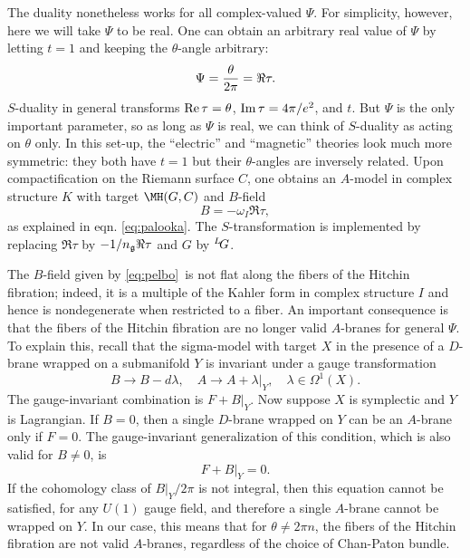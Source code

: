 The duality nonetheless works for all complex-valued $\Psi$. For
simplicity, however, here we will take $\Psi$ to be real. One can
obtain an arbitrary real value of $\Psi$ by letting $t=1$ and
keeping the $\theta$-angle arbitrary: %
\setcounter{equation}{25}
\begin{equation}\label{eq:melo}
\Psi={\theta\over
{2\pi}}=\Re\tau.
\end{equation}
 $S$-duality in general transforms ${\rm
Re}\,\tau=\theta$, ${\rm Im}\,\tau=4\pi/e^2$, and $t$. But $\Psi$
is the only important parameter, so as long as $\Psi$ is real, we
can think of $S$-duality as acting  on $\theta$ only.  In this
set-up, the ``electric'' and ``magnetic'' theories look much more
symmetric: they both have $t=1$ but their $\theta$-angles are
inversely related. Upon compactification on the Riemann surface
$C$, one obtains an $A$-model in complex structure $K$ with target
$\MH(G,C)$ and $B$-field %
\setcounter{equation}{26}
\begin{equation}\label{eq:pelbo}
B=-\omega_I \Re\tau,
\end{equation}
 as
explained in eqn. \eqref{eq:palooka}. The $S$-transformation is implemented
by replacing $\Re\tau$ by $-1/n_{\frak g}\Re\tau$ and $G$ by
$^L\negthinspace G$.

The $B$-field given by \eqref{eq:pelbo}\ is not flat along the fibers of the
Hitchin fibration; indeed, it is a multiple of the Kahler form in
complex structure $I$ and hence is nondegenerate when restricted
to a fiber. An important consequence is that the fibers of the
Hitchin fibration are no longer valid $A$-branes for general
$\Psi$. To explain this, recall that the sigma-model with target
$X$ in the presence of a $D$-brane wrapped on a submanifold $Y$ is
invariant under a gauge transformation %
\setcounter{equation}{27}
\begin{equation}\label{eq:zebol}
B\to
B-d\lambda,\quad A\to A+\lambda\vert_Y,\quad \lambda\in
\Omega^1(X).
\end{equation}
 The gauge-invariant combination is $F+B\vert_Y$. Now
suppose $X$ is symplectic and $Y$ is Lagrangian. If $B=0$, then a
single $D$-brane wrapped on $Y$ can be an $A$-brane only if $F=0$.
The  gauge-invariant generalization of this condition, which is
also valid for $B\neq 0$, is %
\setcounter{equation}{28}
\begin{equation}\label{eq:subol}
F+B\vert_Y=0.
\end{equation}
 If the
cohomology class of $B|_Y/2\pi$ is not integral, then this
equation cannot be satisfied, for any $U(1)$ gauge field, and
therefore a single $A$-brane cannot be wrapped on $Y$. In our
case, this means that for $\theta\neq 2\pi n$, the fibers of the
Hitchin fibration are not valid $A$-branes, regardless of the
choice of Chan-Paton bundle.

